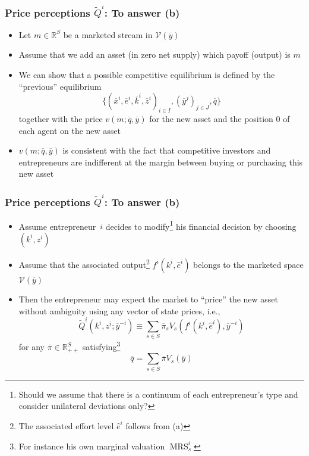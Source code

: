 \documentclass[blue]{beamer}
\def\R{\mathbb{R}}
\DeclareMathOperator\MRS{MRS}
\theoremstyle{definition}
\theoremstyle{example}
\begin{document}

\begin{frame}\frametitle{Price perceptions $\widetilde{Q}^i$: To answer (b)}

\begin{itemize}
\item Let $m \in \R^S$ be a marketed stream in $\mathcal{V}(\overline{y})$
\item Assume that we add an asset (in zero net supply) which payoff (output) is $m$
\item We can show that a possible competitive equilibrium is defined by the ``previous'' equilibrium
 \[
 \{(\overline{x}^i,\overline{e}^i,\overline{k}^i,\overline{z}^i)_{i\in I},(\overline{y}^j)_{j\in J},\overline{q}\}
 \]
 together with the price $v(m;\overline{q},\overline{y})$ for the new asset and the position $0$ of each agent on the new asset
\item $v(m;\overline{q},\overline{y})$ is consistent with the fact that competitive investors and entrepreneurs are indifferent at the margin between buying or purchasing this new asset
\end{itemize}
\end{frame}


\begin{frame}\frametitle{Price perceptions $\widetilde{Q}^i$: To answer (b)}

\begin{itemize}
\item Assume entrepreneur~$i$ decides to modify\footnote{\alert{Should we assume that there is a continuum of each entrepreneur's type and consider unilateral deviations only?}} his financial
decision by choosing $(k^i,z^i)$
\item Assume that the associated output\footnote{The associated effort level $\widehat{e}^i$ follows from (a)} $f^i(k^i,\widehat{e}^i)$ belongs to the marketed space $\mathcal{V}(\overline{y})$
\item Then the entrepreneur may expect the market to ``price'' the new asset without ambiguity using any vector of state prices, i.e.,
\[
\widetilde{Q}^i(k^i,z^i;\overline{y}^{-i}) \equiv \sum_{s\in S} \overline{\pi}_s V_s(f^i(k^i,\widehat{e}^i),\overline{y}^{-i})
\]
for any $\overline{\pi} \in \R^S_{++}$ satisfying\footnote{For instance his own marginal valuation $\MRS^i_{s}$}
\[
\overline{q} = \sum_{s\in S} \overline{\pi} V_s(\overline{y})
\]
\end{itemize}

\end{frame}
\end{document}
